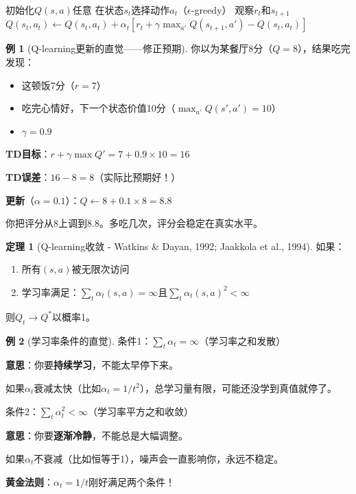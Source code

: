 \documentclass[11pt,a4paper]{article}
\theoremstyle{definition}
\newtheorem{example}{例}[section]
\newtheorem{theorem}{定理}[section]
\begin{document}
\begin{algorithm}[H]
\caption{Q-learning}
\begin{algorithmic}[1]
\State 初始化$Q(s,a)$任意
    \State 在状态$s_t$选择动作$a_t$（$\epsilon$-greedy）
    \State 观察$r_t$和$s_{t+1}$
    \State $Q(s_t, a_t) \leftarrow Q(s_t, a_t) + \alpha_t \left[r_t + \gamma \max_{a'} Q(s_{t+1}, a') - Q(s_t, a_t)\right]$
\EndFor
\end{algorithmic}
\end{algorithm}

\begin{example}[Q-learning更新的直觉——修正预期]
你以为某餐厅8分（$Q = 8$），结果吃完发现：
\begin{itemize}
    \item 这顿饭7分（$r = 7$）
    \item 吃完心情好，下一个状态价值10分（$\max_{a'} Q(s', a') = 10$）
    \item $\gamma = 0.9$
\end{itemize}

\textbf{TD目标}：$r + \gamma \max Q' = 7 + 0.9 \times 10 = 16$

\textbf{TD误差}：$16 - 8 = 8$（实际比预期好！）

\textbf{更新}（$\alpha = 0.1$）：$Q \leftarrow 8 + 0.1 \times 8 = 8.8$

你把评分从8上调到8.8。多吃几次，评分会稳定在真实水平。
\end{example}

\begin{theorem}[Q-learning收敛 - Watkins \& Dayan, 1992; Jaakkola et al., 1994]
如果：
\begin{enumerate}
    \item 所有$(s,a)$被无限次访问
    \item 学习率满足：$\sum_t \alpha_t(s,a) = \infty$且$\sum_t \alpha_t(s,a)^2 < \infty$
\end{enumerate}
则$Q_t \to Q^*$以概率1。
\end{theorem}

\begin{example}[学习率条件的直觉]
条件1：$\sum_t \alpha_t = \infty$（学习率之和发散）

\textbf{意思}：你要\textbf{持续学习}，不能太早停下来。

如果$\alpha_t$衰减太快（比如$\alpha_t = 1/t^2$），总学习量有限，可能还没学到真值就停了。

条件2：$\sum_t \alpha_t^2 < \infty$（学习率平方之和收敛）

\textbf{意思}：你要\textbf{逐渐冷静}，不能总是大幅调整。

如果$\alpha_t$不衰减（比如恒等于1），噪声会一直影响你，永远不稳定。

\textbf{黄金法则}：$\alpha_t = 1/t$刚好满足两个条件！
\end{example}
\end{document}
